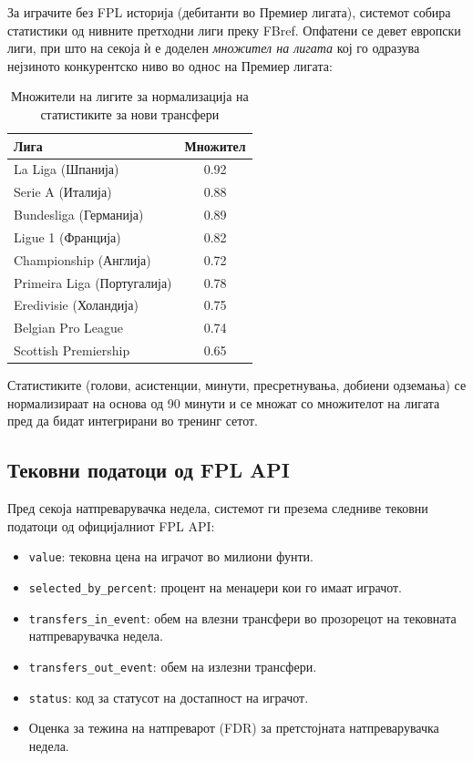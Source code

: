 За играчите без FPL историја (дебитанти во Премиер лигата), системот собира статистики од нивните претходни лиги преку FBref. Опфатени се девет европски лиги, при што на секоја ѝ е доделен \textit{множител на лигата} кој го одразува нејзиното конкурентско ниво во однос на Премиер лигата:

\begin{table}[h]
\centering
\caption{Множители на лигите за нормализација на статистиките за нови трансфери}
\label{tab:league_multipliers_en}
\begin{tabular}{lc}
\toprule
\textbf{Лига} & \textbf{Множител} \\
\midrule
La Liga (Шпанија)            & 0.92 \\
Serie A (Италија)            & 0.88 \\
Bundesliga (Германија)       & 0.89 \\
Ligue 1 (Франција)           & 0.82 \\
Championship (Англија)       & 0.72 \\
Primeira Liga (Португалија)  & 0.78 \\
Eredivisie (Холандија)       & 0.75 \\
Belgian Pro League           & 0.74 \\
Scottish Premiership         & 0.65 \\
\bottomrule
\end{tabular}
\end{table}

Статистиките (голови, асистенции, минути, пресретнувања, добиени одземања) се нормализираат на основа од 90 минути и се множат со множителот на лигата пред да бидат интегрирани во тренинг сетот.

\subsection{Тековни податоци од FPL API}

Пред секоја натпреварувачка недела, системот ги презема следниве тековни податоци од официјалниот FPL API:
\begin{itemize}
  \item \texttt{value}: тековна цена на играчот во милиони фунти.
  \item \texttt{selected\_by\_percent}: процент на менаџери кои го имаат играчот.
  \item \texttt{transfers\_in\_event}: обем на влезни трансфери во прозорецот на тековната натпреварувачка недела.
  \item \texttt{transfers\_out\_event}: обем на излезни трансфери.
  \item \texttt{status}: код за статусот на достапност на играчот.
  \item Оценка за тежина на натпреварот (FDR) за претстојната натпреварувачка недела.
\end{itemize}

